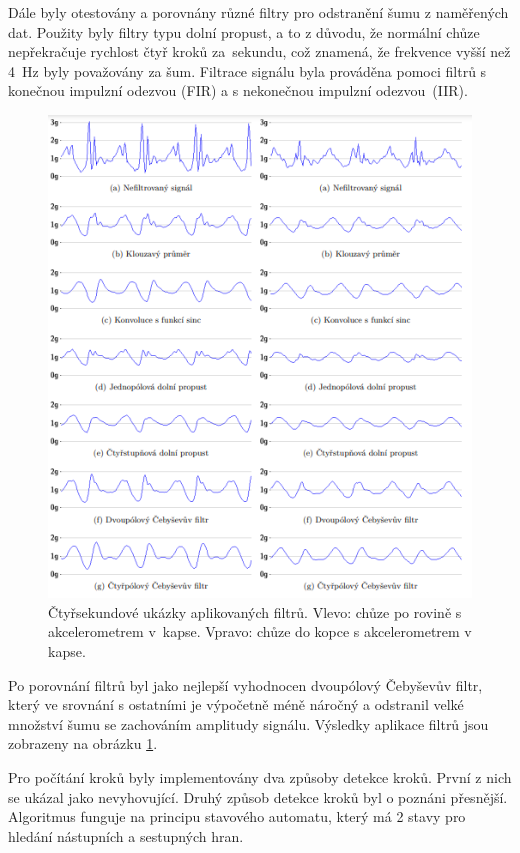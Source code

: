 Dále byly otestovány a porovnány různé filtry pro odstranění šumu z naměřených dat.
Použity byly filtry typu dolní propust, a to z důvodu, že normální chůze
nepřekračuje rychlost čtyř kroků za~sekundu, což znamená, že frekvence vyšší než
4~Hz byly považovány za šum. Filtrace signálu byla prováděna pomoci filtrů s
konečnou impulzní odezvou (FIR) a s nekonečnou impulzní odezvou~(IIR).

\begin{figure}[!h]
	\centering
	\includegraphics[width = .95\linewidth]{Figures/Filtry.png}
	\captionsetup{justification = centering}
	\caption{Čtyřsekundové ukázky aplikovaných filtrů. Vlevo: chůze po rovině s
	akcelerometrem v~kapse. Vpravo: chůze do kopce s akcelerometrem v
	kapse\cite{krokomer}.}
	\label{fig:filtr}
\end{figure}

Po porovnání filtrů byl jako nejlepší vyhodnocen dvoupólový Čebyševův filtr, který
ve srovnání s ostatními je výpočetně méně náročný a odstranil velké množství šumu se
zachováním amplitudy signálu. Výsledky aplikace filtrů jsou zobrazeny na obrázku \ref{fig:filtr}.

Pro počítání kroků byly implementovány dva způsoby detekce kroků. První z nich se
ukázal jako nevyhovující. Druhý způsob detekce kroků byl o poznáni přesnější.
Algoritmus funguje na principu stavového automatu, který má 2 stavy pro hledání
nástupních a sestupných hran.

